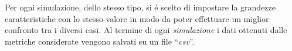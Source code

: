 Per ogni simulazione, dello stesso tipo, si \'e scelto di impostare la grandezze caratteristiche
con lo stesso valore in modo da poter effettuare un miglior confronto tra i diversi casi. Al termine
di ogni \textit{simulazione} i dati ottenuti dalle metriche considerate vengono salvati su un file ``\textit{csv}''.